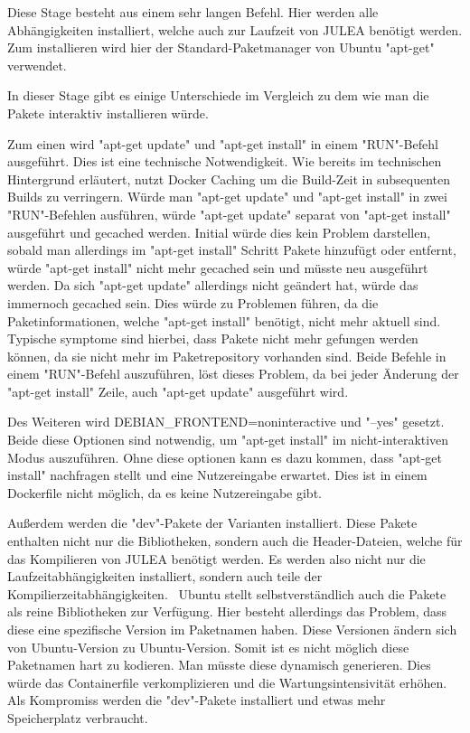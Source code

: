 \inputminted[firstline=10,lastline=25]{dockerfile}{./code-examples/Dockerfile.system}

Diese Stage besteht aus einem sehr langen Befehl. Hier werden alle Abhängigkeiten installiert, welche auch zur Laufzeit von JULEA benötigt werden. Zum installieren wird hier der Standard-Paketmanager von Ubuntu "apt-get" verwendet. 

In dieser Stage gibt es einige Unterschiede im Vergleich zu dem wie man die Pakete interaktiv installieren würde. 

Zum einen wird "apt-get update" und "apt-get install" in einem "RUN"-Befehl ausgeführt. Dies ist eine technische Notwendigkeit. Wie bereits im technischen Hintergrund erläutert, nutzt Docker Caching um die Build-Zeit in subsequenten Builds zu verringern. Würde man "apt-get update" und "apt-get install" in zwei "RUN"-Befehlen ausführen, würde "apt-get update" separat von "apt-get install" ausgeführt und gecached werden. Initial würde dies kein Problem darstellen, sobald man allerdings im "apt-get install" Schritt Pakete hinzufügt oder entfernt, würde "apt-get install" nicht mehr gecached sein und müsste neu ausgeführt werden. Da sich "apt-get update" allerdings nicht geändert hat, würde das immernoch gecached sein. Dies würde zu Problemen führen, da die Paketinformationen, welche "apt-get install" benötigt, nicht mehr aktuell sind. Typische symptome sind hierbei, dass Pakete nicht mehr gefungen werden können, da sie nicht mehr im Paketrepository vorhanden sind. Beide Befehle in einem "RUN"-Befehl auszuführen, löst dieses Problem, da bei jeder Änderung der "apt-get install" Zeile, auch "apt-get update" ausgeführt wird.

Des Weiteren wird DEBIAN\_FRONTEND=noninteractive und "--yes" gesetzt. Beide diese Optionen sind notwendig, um "apt-get install" im nicht-interaktiven Modus auszuführen. Ohne diese optionen kann es dazu kommen, dass "apt-get install" nachfragen stellt und eine Nutzereingabe erwartet. Dies ist in einem Dockerfile nicht möglich, da es keine Nutzereingabe gibt.

Außerdem werden die "dev"-Pakete der Varianten installiert. Diese Pakete enthalten nicht nur die Bibliotheken, sondern auch die Header-Dateien, welche für das Kompilieren von JULEA benötigt werden. Es werden also nicht nur die Laufzeitabhängigkeiten installiert, sondern auch teile der Kompilierzeitabhängigkeiten. \
Ubuntu stellt selbstverständlich auch die Pakete als reine Bibliotheken zur Verfügung. Hier besteht allerdings das Problem, dass diese eine spezifische Version im Paketnamen haben. Diese Versionen ändern sich von Ubuntu-Version zu Ubuntu-Version. Somit ist es nicht möglich diese Paketnamen hart zu kodieren. Man müsste diese dynamisch generieren. Dies würde das Containerfile verkomplizieren und die Wartungsintensivität erhöhen. Als Kompromiss werden die "dev"-Pakete installiert und etwas mehr Speicherplatz verbraucht.

